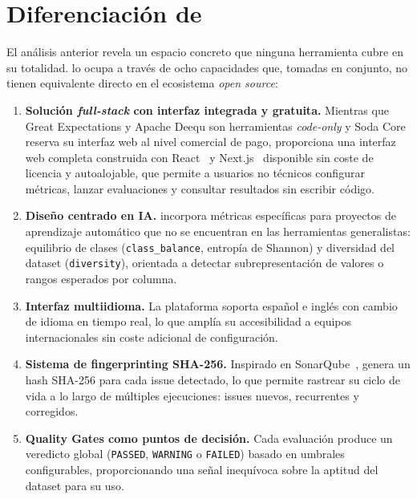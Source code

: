 \section{Diferenciación de \dataqual}
\label{sec:diferenciacion}

El análisis anterior revela un espacio concreto que ninguna herramienta cubre
en su totalidad. \dataqual lo ocupa a través de ocho capacidades que, tomadas
en conjunto, no tienen equivalente directo en el ecosistema \emph{open source}:

\begin{enumerate}
  \item \textbf{Solución \emph{full-stack} con interfaz integrada y gratuita.}
    Mientras que Great Expectations y Apache Deequ son herramientas
    \emph{code-only} y Soda Core reserva su interfaz web al nivel comercial
    de pago, \dataqual proporciona una interfaz web completa construida con
    React~\citep{react} y Next.js~\citep{nextjs} disponible sin coste de
    licencia y autoalojable, que permite a usuarios no técnicos configurar
    métricas, lanzar evaluaciones y consultar resultados sin escribir código.

  \item \textbf{Diseño centrado en \ac{IA}.} \dataqual incorpora métricas
    específicas para proyectos de aprendizaje automático que no se encuentran
    en las herramientas generalistas: equilibrio de clases (\texttt{class\_balance},
    entropía de Shannon) y diversidad del dataset (\texttt{diversity}),
    orientada a detectar subrepresentación de valores o rangos esperados por
    columna.

  \item \textbf{Interfaz multiidioma.} La plataforma soporta español e inglés
    con cambio de idioma en tiempo real, lo que amplía su accesibilidad a
    equipos internacionales sin coste adicional de configuración.

  \item \textbf{Sistema de fingerprinting SHA-256.} Inspirado en
    SonarQube~\citep{sonarqube}, \dataqual genera un hash \ac{SHA}-256 para cada
    issue detectado, lo que permite rastrear su ciclo de vida a lo largo de
    múltiples ejecuciones: issues nuevos, recurrentes y corregidos.

  \item \textbf{Quality Gates como puntos de decisión.} Cada evaluación produce
    un veredicto global (\texttt{PASSED}, \texttt{WARNING} o \texttt{FAILED})
    basado en umbrales configurables, proporcionando una señal inequívoca
    sobre la aptitud del dataset para su uso.


\end{enumerate}
